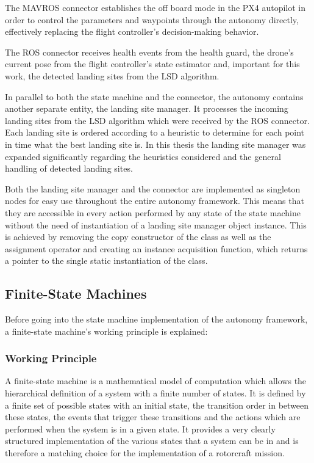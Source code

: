 The MAVROS connector establishes the off board mode in the PX4 autopilot in order to control the parameters and waypoints through the autonomy directly, effectively replacing the flight controller's decision-making behavior. 

The ROS connector receives health events from the health guard, the drone's current pose from the flight controller's state estimator and, important for this work, the detected landing sites from the LSD algorithm.

In parallel to both the state machine and the connector, the autonomy contains another separate entity, the landing site manager. It processes the incoming landing sites from the LSD algorithm which were received by the ROS connector. Each landing site is ordered according to a heuristic to determine for each point in time what the best landing site is. In this thesis the landing site manager was expanded significantly regarding the heuristics considered and the general handling of detected landing sites. 

Both the landing site manager and the connector are implemented as singleton nodes for easy use throughout the entire autonomy framework. This means that they are accessible in every action performed by any state of the state machine without the need of instantiation of a landing site manager object instance. This is achieved by removing the copy constructor of the class as well as the assignment operator and creating an instance acquisition function, which returns a pointer to the single static instantiation of the class.

\subsection{Finite-State Machines}

Before going into the state machine implementation of the autonomy framework, a finite-state machine's working principle is explained:

\subsubsection{Working Principle}

A finite-state machine is a mathematical model of computation which allows the hierarchical definition of a system with a finite number of states. It is defined by a finite set of possible states with an initial state, the transition order in between these states, the events that trigger these transitions and the actions which are performed when the system is in a given state. It provides a very clearly structured implementation of the various states that a system can be in and is therefore a matching choice for the implementation of a rotorcraft mission. 

